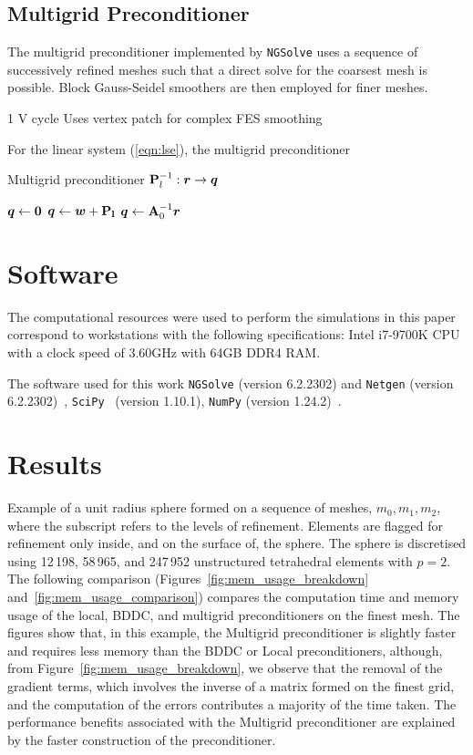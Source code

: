 \documentclass[a4paper,12]{elsarticle}
\theoremstyle{definition}
\renewcommand{\vec}[1]{\mbox{\boldmath$#1$}}
\begin{document}
\subsection{Multigrid Preconditioner}
The multigrid preconditioner implemented by \texttt{NGSolve} uses a sequence of successively refined meshes such that a direct solve for the coarsest mesh is possible. Block Gauss-Seidel smoothers are then employed for finer meshes.

1 V cycle
Uses vertex patch for complex FES smoothing

For the linear system (\ref{eqn:lse}), the multigrid preconditioner
\begin{algorithm}
\caption{Multigrid preconditioner $\mathbf{P}^{-1}_{l} : \vec{r} \rightarrow \vec{q}$}
\begin{algorithmic}
\State $\vec{q} \gets \vec{0}$
\State $\vec{q} \gets \vec{w} + \mathbf{P_l}$
\Else
\State $\vec{q} \gets \mathbf{A}_0^{-1} \vec{r}$
\EndIf
\EndFor


\end{algorithmic}
\end{algorithm}





\section{Software}\label{sect:software}
The  computational resources were used to perform the simulations in this paper correspond to  workstations with the following specifications: Intel i7-9700K CPU with a clock speed of 3.60GHz with 64GB DDR4 RAM.

The software used for this work \texttt{NGSolve} (version 6.2.2302) and \texttt{Netgen} (version 6.2.2302)~\cite{NGSolve,zaglmayrphd,netgendet}, \texttt{SciPy}~\cite{2020SciPy-NMeth} (version 1.10.1), \texttt{NumPy} (version 1.24.2)~\cite{harris2020array}.


\section{Results}\label{sect:results}
Example of a unit radius sphere formed on a sequence of meshes, $m_0, m_1, m_2$, where the subscript refers to the levels of refinement. Elements are flagged for refinement only inside, and on the surface of, the sphere. The sphere is discretised using 12\,198, 58\,965, and 247\,952 unstructured tetrahedral elements with $p=2$. The following comparison (Figures~\ref{fig:mem_usage_breakdown} and~\ref{fig:mem_usage_comparison}) compares the computation time and memory usage of the local, BDDC, and multigrid preconditioners on the finest mesh. The figures show that, in this example, the Multigrid preconditioner is slightly faster and requires less memory than the BDDC or Local preconditioners, although, from Figure~\ref{fig:mem_usage_breakdown}, we observe that the removal of the gradient terms, which involves the inverse of a matrix formed on the finest grid, and the computation of the errors contributes a majority of the time taken. The performance benefits associated with the Multigrid preconditioner are explained by the faster construction of the preconditioner.
\end{document}
